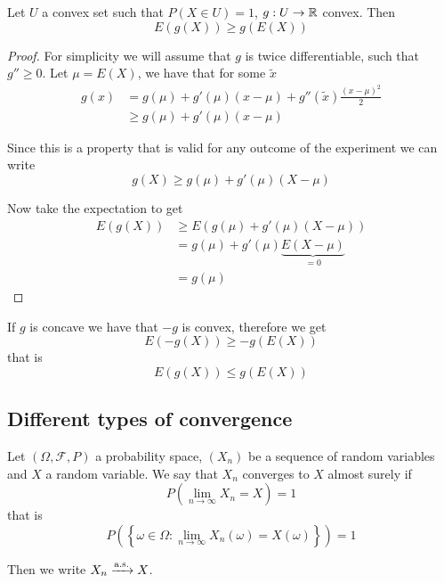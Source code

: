 \documentclass[12pt]{extarticle}
\newcommand{\convas}{\xrightarrow{\operatorfont a.s.}}
\begin{document}
\begin{theorem}
    \label{thm:conv:jensen}
    Let $U$ a convex set such that $P(X \in U) = 1$, $g : U \to \mathbb{R}$ convex.
    Then
    \begin{equation}
        E(g(X)) \geq g(E(X))
    \end{equation}
\end{theorem}

\begin{proof}
    For simplicity we will assume that $g$ is twice differentiable, such that $g'' \geq 0$.
    Let $\mu = E(X)$, we have that for some $\tilde{x}$
    \begin{align}
        g(x) & = g(\mu) + g'(\mu) (x - \mu) + g''(\tilde{x}) \frac{(x-\mu)^2}{2} \\
             & \geq g(\mu) + g'(\mu) (x - \mu)
    \end{align}

    Since this is a property that is valid for any outcome of the experiment we can write
    \begin{equation}
        g(X) \geq g(\mu) + g'(\mu)(X - \mu)
    \end{equation}

    Now take the expectation to get
    \begin{align}
        E(g(X)) & \geq E(g(\mu) + g'(\mu)(X - \mu))                \\
                & = g(\mu) + g'(\mu) \underbrace{E(X - \mu)}_{= 0} \\
                & = g(\mu)
    \end{align}
\end{proof}

\begin{corollary}
    If $g$ is concave we have that $-g$ is convex, therefore we get
    \begin{equation}
        E(-g(X)) \geq -g(E(X))
    \end{equation}
    that is
    \begin{equation}
        E(g(X)) \leq g(E(X))
    \end{equation}
\end{corollary}

\subsection{Different types of convergence}

\begin{definition}
    Let $(\Omega, \mathcal F, P)$ a probability space, $(X_n)$ be a sequence of random variables and $X$ a random variable.
    We say that $X_n$ converges to $X$ almost surely if
    \begin{equation}
        P\left(\lim_{n \to \infty} X_n = X\right) = 1
    \end{equation}
    that is
    \begin{equation}
        P\left(\left\{ \omega \in \Omega : \lim_{n \to \infty} X_n(\omega) = X(\omega) \right\}\right) = 1
    \end{equation}

    Then we write $X_n \convas X$.
\end{definition}
\end{document}

